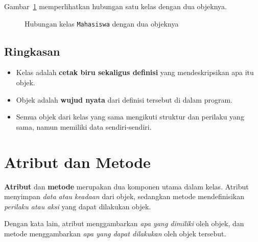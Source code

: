 Gambar~\ref{fig:b8-kelas-objek} memperlihatkan hubungan satu kelas dengan dua objeknya.

\begin{figure}[H]
  \centering
  \caption{Hubungan kelas \texttt{Mahasiswa} dengan dua objeknya}
  \label{fig:b8-kelas-objek}
\end{figure}

\subsection*{Ringkasan}
\begin{itemize}
    \item Kelas adalah \textbf{cetak biru sekaligus definisi} yang mendeskripsikan apa itu objek.
    \item Objek adalah \textbf{wujud nyata} dari definisi tersebut di dalam program.
    \item Semua objek dari kelas yang sama mengikuti struktur dan perilaku yang sama, namun memiliki data sendiri-sendiri.
\end{itemize}


\section{Atribut dan Metode}

\textbf{Atribut} dan \textbf{metode} merupakan dua komponen utama dalam kelas.  
Atribut menyimpan \emph{data atau keadaan} dari objek, sedangkan metode mendefinisikan \emph{perilaku atau aksi} yang dapat dilakukan objek.

Dengan kata lain, atribut menggambarkan \emph{apa yang dimiliki} oleh objek, dan metode menggambarkan \emph{apa yang dapat dilakukan} oleh objek tersebut.

